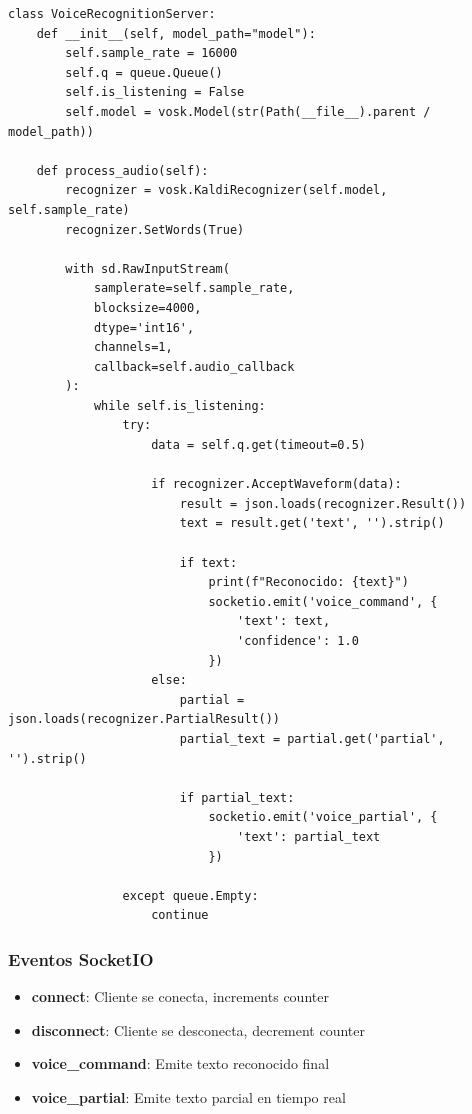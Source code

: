 \documentclass[12pt,a4paper]{article}
\begin{document}
\begin{lstlisting}[caption={Voice Server - Procesamiento de Audio}, style=pythonstyle, label=lst:voice-process]
class VoiceRecognitionServer:
    def __init__(self, model_path="model"):
        self.sample_rate = 16000
        self.q = queue.Queue()
        self.is_listening = False
        self.model = vosk.Model(str(Path(__file__).parent / model_path))
        
    def process_audio(self):
        recognizer = vosk.KaldiRecognizer(self.model, self.sample_rate)
        recognizer.SetWords(True)
        
        with sd.RawInputStream(
            samplerate=self.sample_rate,
            blocksize=4000,
            dtype='int16',
            channels=1,
            callback=self.audio_callback
        ):
            while self.is_listening:
                try:
                    data = self.q.get(timeout=0.5)
                    
                    if recognizer.AcceptWaveform(data):
                        result = json.loads(recognizer.Result())
                        text = result.get('text', '').strip()
                        
                        if text:
                            print(f"Reconocido: {text}")
                            socketio.emit('voice_command', {
                                'text': text, 
                                'confidence': 1.0
                            })
                    else:
                        partial = json.loads(recognizer.PartialResult())
                        partial_text = partial.get('partial', '').strip()
                        
                        if partial_text:
                            socketio.emit('voice_partial', {
                                'text': partial_text
                            })
                            
                except queue.Empty:
                    continue
\end{lstlisting}

\subsubsection{Eventos SocketIO}

\begin{itemize}
    \item \textbf{connect}: Cliente se conecta, increments counter
    \item \textbf{disconnect}: Cliente se desconecta, decrement counter
    \item \textbf{voice\_command}: Emite texto reconocido final
    \item \textbf{voice\_partial}: Emite texto parcial en tiempo real
\end{itemize}
\end{document}
